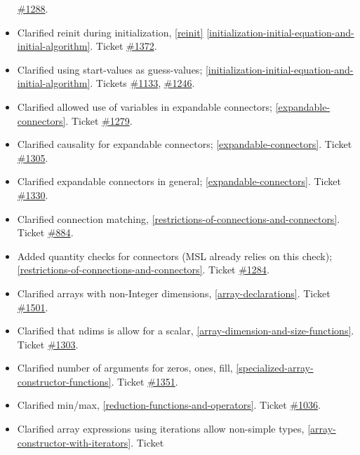 \documentclass[../MLS.tex]{subfiles}
\begin{document}
\begin{itemize}
  \href{https://trac.modelica.org/Modelica/ticket/1288}{\#1288}.
\item
  Clarified reinit during initialization, \autoref{reinit} \autoref{initialization-initial-equation-and-initial-algorithm}. Ticket
  \href{https://trac.modelica.org/Modelica/ticket/1372}{\#1372}.
\item
  Clarified using start-values as guess-values; \autoref{initialization-initial-equation-and-initial-algorithm}. Tickets
  \href{https://trac.modelica.org/Modelica/ticket/1133}{\#1133},
  \href{https://trac.modelica.org/Modelica/ticket/1246}{\#1246}.
\item
  Clarified allowed use of variables in expandable connectors; \autoref{expandable-connectors}. Ticket
  \href{https://trac.modelica.org/Modelica/ticket/1279}{\#1279}.
\item
  Clarified causality for expandable connectors; \autoref{expandable-connectors}. Ticket
  \href{https://trac.modelica.org/Modelica/ticket/1305}{\#1305}.
\item
  Clarified expandable connectors in general; \autoref{expandable-connectors}. Ticket
  \href{https://trac.modelica.org/Modelica/ticket/1330}{\#1330}.
\item
  Clarified connection matching, \autoref{restrictions-of-connections-and-connectors}. Ticket
  \href{https://trac.modelica.org/Modelica/ticket/884}{\#884}.
\item
  Added quantity checks for connectors (MSL already relies on this
  check); \autoref{restrictions-of-connections-and-connectors}. Ticket
  \href{https://trac.modelica.org/Modelica/ticket/1284}{\#1284}.
\item
  Clarified arrays with non-Integer dimensions, \autoref{array-declarations}. Ticket
  \href{https://trac.modelica.org/Modelica/ticket/1501}{\#1501}.
\item
  Clarified that ndims is allow for a scalar, \autoref{array-dimension-and-size-functions}. Ticket
  \href{https://trac.modelica.org/Modelica/ticket/1303}{\#1303}.
\item
  Clarified number of arguments for zeros, ones, fill, \autoref{specialized-array-constructor-functions}.
  Ticket \href{https://trac.modelica.org/Modelica/ticket/1351}{\#1351}.
\item
  Clarified min/max, \autoref{reduction-functions-and-operators}. Ticket
  \href{https://trac.modelica.org/Modelica/ticket/1036}{\#1036}.
\item
  Clarified array expressions using iterations allow non-simple types,
  \autoref{array-constructor-with-iterators}. Ticket

\end{itemize}
\end{document}
